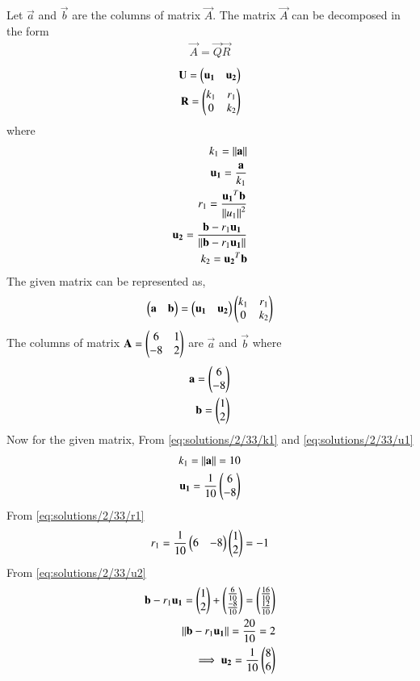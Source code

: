 Let $\vec{a}$ and $\vec{b}$ are the columns of matrix $\vec{A}$. The matrix $\vec{A}$ can be decomposed in the form
\begin{align}
    \vec{A}=\vec{Q}\vec{R}
\end{align}
\begin{align}
    \mathbf{U}=\begin{pmatrix}\mathbf{u_1}&\mathbf{u_2}\end{pmatrix}\\
    \mathbf{R}=\begin{pmatrix}k_1&r_1\\0&k_2\end{pmatrix}
\end{align}
where
\begin{align}
    k_1=\left\lVert\mathbf{a}\right\rVert\label{eq:solutions/2/33/k1}\\
    \mathbf{u_1}=\frac{\mathbf{a}}{k_1}\label{eq:solutions/2/33/u1}\\
    r_1=\frac{\mathbf{u_1}^T\mathbf{b}}{\left\lVert u_1\right\rVert^2}\label{eq:solutions/2/33/r1}\\
    \mathbf{u_2}=\frac{\mathbf{b}-r_1\mathbf{u_1}}{\left\lVert\mathbf{b}-r_1\mathbf{u_1}\right\rVert}\label{eq:solutions/2/33/u2}\\
    k_2=\mathbf{u_2}^T\mathbf{b}\label{eq:solutions/2/33/k2}
\end{align}
The given matrix can be represented as,
\begin{align}\label{eq:solutions/2/33/rep}
    \begin{pmatrix}\mathbf{a}&\mathbf{b}\end{pmatrix}=\begin{pmatrix}\mathbf{u_1}&\mathbf{u_2}\end{pmatrix}\begin{pmatrix}k_1&r_1\\0&k_2\end{pmatrix}
\end{align}
The columns of matrix $\mathbf{A}=\begin{pmatrix}6&1\\-8&2\end{pmatrix}$ are $\vec{a}$ and $\vec{b}$ where
\begin{align}
    \mathbf{a}=\begin{pmatrix}6\\-8\end{pmatrix}\label{eq:solutions/2/33/a}\\
    \mathbf{b}=\begin{pmatrix}1\\2\end{pmatrix}\label{eq:solutions/2/33/b}
\end{align}
Now for the given matrix, From \eqref{eq:solutions/2/33/k1} and \eqref{eq:solutions/2/33/u1}
\begin{align}
k_1=\left\lVert\mathbf{a}\right\rVert=10\\
\mathbf{u_1}=\frac{1}{10}\begin{pmatrix}6\\-8\end{pmatrix}
\end{align}
From \eqref{eq:solutions/2/33/r1}
\begin{align}
r_1=\frac{1}{10}\begin{pmatrix}6&-8\end{pmatrix}\begin{pmatrix}1\\2\end{pmatrix}=-1
\end{align}
From \eqref{eq:solutions/2/33/u2}
\begin{align}
\mathbf{b}-r_1\mathbf{u_1}=\begin{pmatrix}1\\2\end{pmatrix}+\begin{pmatrix}\frac{6}{10}\\\frac{-8}{10}\end{pmatrix}=\begin{pmatrix}\frac{16}{10}\\\frac{12}{10}\end{pmatrix}\\
\left\lVert\mathbf{b}-r_1\mathbf{u_1}\right\rVert=\frac{20}{10}=2\\
\implies \mathbf{u_2}=\frac{1}{10}\begin{pmatrix}8\\6\end{pmatrix}
\end{align}
